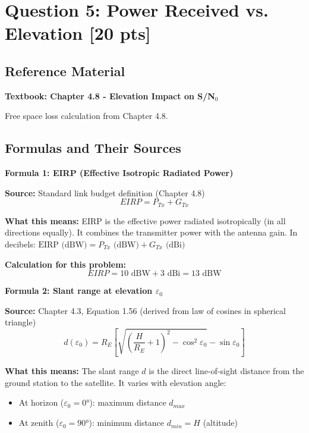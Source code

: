 \documentclass[11pt,letterpaper]{article}
\begin{document}
\section{Question 5: Power Received vs. Elevation [20 pts]}

\subsection{Reference Material}
\textbf{Textbook: Chapter 4.8 - Elevation Impact on S/N$_0$}

Free space loss calculation from Chapter 4.8.

\subsection{Formulas and Their Sources}

\textbf{Formula 1: EIRP (Effective Isotropic Radiated Power)}

\textbf{Source:} Standard link budget definition (Chapter 4.8)
\begin{equation}
EIRP = P_{Tx} + G_{Tx}
\end{equation}

\textbf{What this means:} EIRP is the effective power radiated isotropically (in all directions equally). It combines the transmitter power with the antenna gain. In decibels: $\text{EIRP (dBW)} = P_{Tx} \text{ (dBW)} + G_{Tx} \text{ (dBi)}$

\textbf{Calculation for this problem:}
\begin{equation}
EIRP = 10 \text{ dBW} + 3 \text{ dBi} = 13 \text{ dBW}
\end{equation}

\vspace{0.3cm}

\textbf{Formula 2: Slant range at elevation $\varepsilon_0$}

\textbf{Source:} Chapter 4.3, Equation 1.56 (derived from law of cosines in spherical triangle)
\begin{equation}
d(\varepsilon_0) = R_E \left[\sqrt{\left(\frac{H}{R_E} + 1\right)^2 - \cos^2 \varepsilon_0} - \sin \varepsilon_0\right]
\end{equation}

\textbf{What this means:} The slant range $d$ is the direct line-of-sight distance from the ground station to the satellite. It varies with elevation angle:
\begin{itemize}
    \item At horizon ($\varepsilon_0 = 0°$): maximum distance $d_{max}$
    \item At zenith ($\varepsilon_0 = 90°$): minimum distance $d_{min} = H$ (altitude)
\end{itemize}
\end{document}

